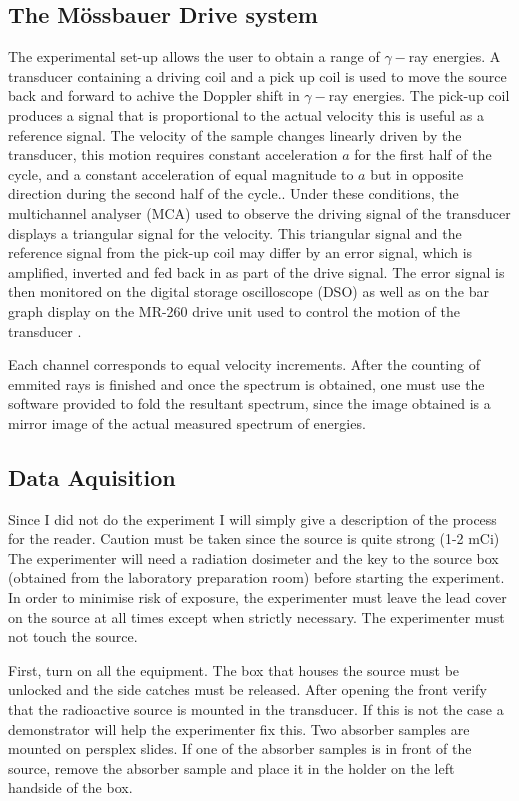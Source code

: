 \documentclass[a4paper, twocolumn]{article}
\begin{document}
\subsection{The Mössbauer Drive system}
The experimental set-up allows the user to obtain a range of $\gamma-$ray energies. A transducer containing a driving coil and a pick up coil is used to move the source back and forward to achive the Doppler shift in $\gamma-$ray energies. The pick-up coil produces a signal that is proportional to the actual velocity this is useful as a reference signal\cite{0}.
The velocity of the sample changes linearly driven by the transducer, this motion requires constant acceleration $a$ for the first half of the cycle, and a constant acceleration of equal magnitude to $a$ but in opposite direction during the second half of the cycle\cite{0}..
Under these conditions, the multichannel analyser (MCA) used to observe the driving signal of the transducer displays a triangular signal for the velocity. 
This triangular signal and the reference signal from the pick-up coil may differ by an error signal, which is amplified, inverted and fed back in as part of the drive signal. The error signal is then monitored on the digital storage oscilloscope (DSO) as well as on the bar graph display on the MR-260 drive unit used to control the motion of the transducer\cite{0} .

Each channel corresponds to equal velocity increments\cite{0}. After the counting of emmited rays is finished and once the spectrum is obtained, one must use the software provided to fold the resultant spectrum, since the image obtained is a mirror image of the actual measured spectrum of energies\cite{0}.

\subsection{Data Aquisition}
Since I did not do the experiment I will simply give a description of the process for the reader.
Caution must be taken since the source is quite strong (1-2 mCi) The experimenter will need a radiation dosimeter and the key to the source box (obtained from the laboratory preparation room) before starting the experiment\cite{0}.
In order to minimise risk of exposure, the experimenter must leave the lead cover on the source at all times except when strictly necessary.
The experimenter must not touch the source.

First, turn on all the equipment. The box that houses the source must be unlocked and the side catches must be released. After opening the front verify that the radioactive source is mounted in the transducer. If this is not the case a demonstrator will help the experimenter fix this. Two absorber samples are mounted on persplex slides. If one of the absorber samples is in front of the source, remove the absorber sample and place it in the holder on the left handside of the box.
\end{document}
